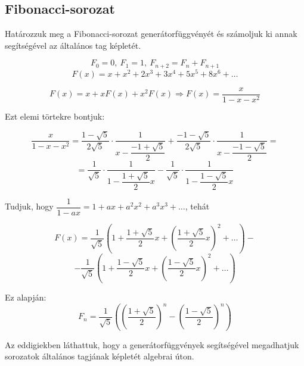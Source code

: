\subsection*{Fibonacci-sorozat}
\begin{problem}
Határozzuk meg a Fibonacci-sorozat generátorfüggvényét és számoljuk
ki annak segítségével az általános tag képletét. 
\end{problem}
\begin{solution}
\[
F_{0}=0,\ F_{1}=1,\ F_{n+2}=F_{n}+F_{n+1}
\]
\[
F(x)=x+x^{2}+2x^{3}+3x^{4}+5x^{5}+8x^{6}+\dots
\]

\[
F(x)=x+xF(x)+x^{2}F(x)\Rightarrow F(x)=\dfrac{x}{1-x-x^{2}}
\]

Ezt elemi törtekre bontjuk:

\[
\dfrac{x}{1-x-x^{2}}=\dfrac{1-\sqrt{5}}{2\sqrt{5}}\cdot\dfrac{1}{x-\dfrac{-1+\sqrt{5}}{2}}+\dfrac{-1-\sqrt{5}}{2\sqrt{5}}\cdot\dfrac{1}{x-\dfrac{-1-\sqrt{5}}{2}}=
\]
\[
=\dfrac{1}{\sqrt{5}}\cdot\dfrac{1}{1-\dfrac{1+\sqrt{5}}{2}x}-\dfrac{1}{\sqrt{5}}\cdot\dfrac{1}{1-\dfrac{1-\sqrt{5}}{2}x}
\]

Tudjuk, hogy $\dfrac{1}{1-ax}=1+ax+a^{2}x^{2}+a^{3}x^{3}+\dots$,
tehát

\[
F(x)=\dfrac{1}{\sqrt{5}}\left(1+\dfrac{1+\sqrt{5}}{2}x+\left(\dfrac{1+\sqrt{5}}{2}x\right)^{2}+\dots\right)-
\]
\[
-\dfrac{1}{\sqrt{5}}\left(1+\dfrac{1-\sqrt{5}}{2}x+\left(\dfrac{1-\sqrt{5}}{2}x\right)^{2}+\dots\right)
\]

Ez alapján: 
\[
F_{n}=\dfrac{1}{\sqrt{5}}\left(\left(\dfrac{1+\sqrt{5}}{2}\right)^{n}-\left(\dfrac{1-\sqrt{5}}{2}\right)^{n}\right)
\]
\end{solution}

Az eddigiekben láthattuk, hogy a generátorfüggvények segítségével
megadhatjuk sorozatok általános tagjának képletét algebrai úton.

